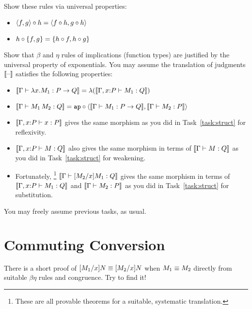 \documentclass[12pt]{article}
\begin{document}
\begin{task}
  Show these rules via universal properties:
  \begin{itemize}
    \item $\langle f,g\rangle \mathbin{\circ} h = \langle f\mathbin{\circ} h,g\mathbin{\circ} h\rangle$
    \item $h \mathbin{\circ} \{ f,g\} = \{ h\mathbin{\circ} f,h\mathbin{\circ} g\}$
  \end{itemize}
\end{task}

\begin{task}
  Show that $\beta$ and $\eta$ rules of implications (function types)
  are justified by the universal property of exponentials.
  You may assume the translation of judgments $\llbracket \text{--}\rrbracket$
  satisfies the following properties:
  \begin{itemize}
    \item $\llbracket \Gamma \vdash \lambda x.M_1 : P \to Q\rrbracket
      = \lambda (\llbracket \Gamma, x{:}P \vdash M_1 : Q\rrbracket)$
    \item $\llbracket \Gamma \vdash M_1\,M_2 : Q\rrbracket
      = \mathtt{ap} \mathbin{\circ} \langle \llbracket \Gamma \vdash M_1 : P \to Q\rrbracket,\llbracket \Gamma \vdash M_2 : P\rrbracket\rangle$
    \item
      $\llbracket \Gamma, x{:}P \vdash x : P\rrbracket$ gives the same morphism
      as you did in Task~\ref{task:struct} for reflexivity.
    \item
      $\llbracket \Gamma, x{:}P \vdash M : Q\rrbracket$ also gives the same morphism
      in terms of $\llbracket \Gamma \vdash M : Q\rrbracket$
      as you did in Task~\ref{task:struct} for weakening.
    \item
      Fortunately,%
      \footnote{These are all provable theorems for a suitable, systematic translation.}
      $\llbracket \Gamma \vdash [M_2/x]M_1 : Q\rrbracket$ gives the same morphism
      in terms of $\llbracket \Gamma, x{:}P \vdash M_1 : Q\rrbracket$ and $\llbracket \Gamma \vdash M_2 : P\rrbracket$
      as you did in Task~\ref{task:struct} for substitution.
  \end{itemize}
  You may freely assume previous tasks, as usual.
\end{task}

\section{Commuting Conversion}

\begin{bonus}
  There is a short proof of
  $[M_1/x]N \equiv [M_2/x]N$ when $M_1 \equiv M_2$
  directly from suitable $\beta\eta$ rules and congruence.
  Try to find it!
\end{bonus}
\end{document}
